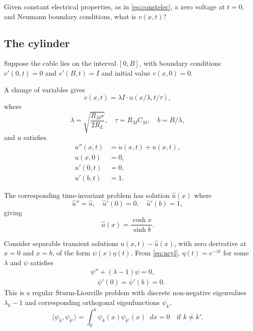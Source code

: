\documentclass[parskip=half]{scrartcl}
\newcommand{\Int}[2]{\int_{#1}^{#2}\!}
\newcommand{\D}{\mathop{}\!d}
\theoremstyle{nonumberplain}
\begin{document}
Given constant electrical properties, as in \eqref{eq:constelec},
a zero voltage at $t=0$, and Neumann boundary conditions, what
is $v(x, t)$?

\subsection{The cylinder}

Suppose the cable lies on the interval $[0, B]$, with boundary
conditions $v'(0, t) = 0$ and $v'(B, t) = I$ and initial value
$v(x, 0) = 0$.

A change of variables gives
\begin{equation}
    v(x, t) = \lambda I\cdot u(x/\lambda, t/\tau),
\end{equation}
where
\begin{equation}
    \lambda = \sqrt{\frac{R_M r}{2 R_L}}, \quad \tau = R_M C_M, \quad b = B/\lambda,
\end{equation}
and $u$ satisfies
\begin{equation}
    \begin{aligned}
        u''(x, t) &= \dot u(x, t) + u(x, t),\\
        u(x, 0) &= 0,\\
        u'(0, t) &= 0,\\
        u'(b, t) &= 1.
    \end{aligned}
    \label{eq:ucyl}
\end{equation}

The corresponding time-invariant problem has solution $\hat u(x)$ where
\begin{equation}
    \hat u'' = \hat u,\quad \hat u'(0) = 0,\quad \hat u'(b) = 1,
\end{equation}
giving
\begin{equation}
    \hat u(x) = \frac{\cosh x}{\sinh b}.
\end{equation}

Consider separable transient solutions $u(x,t)-\hat u(x)$, with zero derivative
at $x=0$ and $x=b$, of the form $\psi(x)\eta(t)$. From \eqref{eq:ucyl},
$\eta(t)=e^{-\lambda t}$ for some $\lambda$ and $\psi$ satisfies
\begin{gather}
    \label{eq:efncyl}
    \psi'' + (\lambda-1)\psi = 0,\\
    \label{eq:efncylbc}
    \quad \psi'(0)=\psi'(b)=0.
\end{gather}
This is a regular Sturm-Liouville problem with discrete non-negative eigenvalues
$\lambda_k-1$ and corresponding orthogonal eigenfunctions $\psi_k$,
\begin{equation}
    \langle \psi_k, \psi_{k'} \rangle =
    \Int{0}{b} \psi_k(x)\psi_{k'}(x) \D x =0\quad\text{if $k\neq k'$}.
\end{equation}
\end{document}
